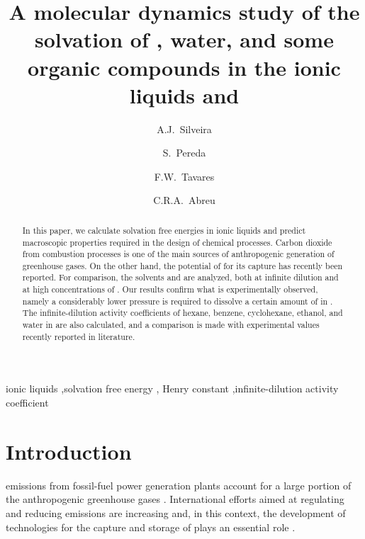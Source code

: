\documentclass[3p,twocolumn]{elsarticle}
\begin{document}
\begin{frontmatter}

\title{A molecular dynamics study of the solvation of , water, and some organic compounds in the ionic liquids \ce{[emim][B(CN)_4]} and \ce{[emim][NTf_2]}}

\author[rvt]{A.J.~Silveira}
\author[rvt]{S.~Pereda}
\author[focal,els]{F.W.~Tavares}
\author[focal]{C.R.A.~Abreu}

\address[rvt]{Planta Piloto de Ingenier\'ia Qu\'imica, PLAPIQUI, Universidad Nacional del Sur,Camino La Carrindanga Km 7-CC: 717, Bah\'ia Blanca, Argentina}
\address[focal]{Chemical Engineering Department, Escola de Qu\'imica, Universidade Federal do Rio de Janeiro,Rio de Janeiro, RJ 21941-909, Brazil}
\address[els]{COPPE, Universidade Federal do Rio de Janeiro, Rio de Janeiro, RJ 21941-909, Brazil}


\begin{abstract}
In this paper, we calculate solvation free energies in ionic liquids and predict macroscopic properties required in the design of chemical processes.
Carbon dioxide from combustion processes is one of the main sources of anthropogenic generation of greenhouse gases.
On the other hand, the potential of \ce{[emim][B(CN)_4]} for its capture has recently been reported.
For comparison, the solvents \ce{[emim][B(CN)_4]} and \ce{[emim][NTf_2]} are analyzed, both at infinite dilution and at high concentrations of .
Our results confirm what is experimentally observed, namely a considerably lower pressure is required to dissolve a certain amount of  in \ce{[emim][B(CN)_4]}.
The infinite-dilution activity coefficients of hexane, benzene, cyclohexane, ethanol, and water in \ce{[emim][B(CN)_4]} are also calculated, and a comparison is made with experimental values recently reported in literature.
\end{abstract}

\begin{keyword}
ionic liquids \sep solvation free energy \sep  {} Henry constant \sep infinite-dilution activity coefficient 
\end{keyword}

\end{frontmatter}

\linenumbers

\section{Introduction}
 emissions from fossil-fuel power generation plants account for a large portion of the anthropogenic greenhouse gases \cite{totalenergy}.
International efforts aimed at regulating and reducing  emissions are increasing \cite{Tong_2018} and, in this context, the development of technologies for the capture and storage of  plays an essential role \cite{Markewitz_2014}. 
\end{document}
